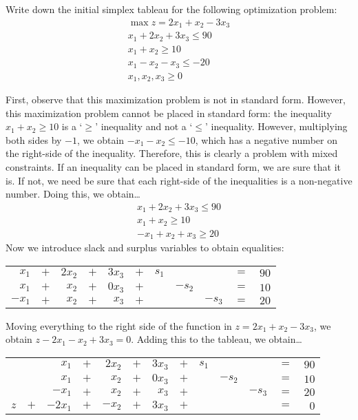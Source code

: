 \documentclass[11pt,letterpaper]{article}
\begin{document}
\newpage



 Write down the initial simplex tableau for the following optimization problem:
	\[
	\begin{aligned}
	\max z= 2x_1 + x_2 - 3x_3 \\
	x_1 + 2x_2 + 3x_3 \leq 90 \\
	x_1 + x_2 \geq 10 \\
	x_1 - x_2 - x_3 \leq -20 \\
	x_1, x_2, x_3 \geq 0 
	\end{aligned}
	\] \pspace

\sol First, observe that this maximization problem is not in standard form. However, this maximization problem cannot be placed in standard form: the inequality $x_1 + x_2 \geq 10$ is a `$\geq$' inequality and not a `$\leq$' inequality. However, multiplying both sides by $-1$, we obtain $-x_1 - x_2 \leq -10$, which has a negative number on the right-side of the inequality. Therefore, this is clearly a problem with mixed constraints. If an inequality can be placed in standard form, we are sure that it is. If not, we need be sure that each right-side of the inequalities is a non-negative number. Doing this, we obtain\dots
	\[
	\begin{aligned}
	x_1 + 2x_2 + 3x_3 \leq 90 \\
	x_1 + x_2 \geq 10 \\
	-x_1 + x_2 + x_3 \geq 20 
	\end{aligned}
	\] 
Now we introduce slack and surplus variables to obtain equalities: \par
	\begin{table}[!ht]
	\centering
	\begin{tabular}{rrrrrrrrrrr}
	$x_1$ & $+$ & $2x_2$ & $+$ & $3x_3$ & $+$ & $s_1$ & & & $=$ & $90$ \\
	$x_1$ & $+$ & $x_2$ & $+$ & $0x_3$ & $+$ & & $-s_2$ & & $=$ & $10$ \\
	$-x_1$ & $+$ & $x_2$ & $+$ & $x_3$ & $+$ & & & $-s_3$ & $=$ & $20$
	\end{tabular}
	\end{table} \par
Moving everything to the right side of the function in $z= 2x_1 + x_2 - 3x_3$, we obtain $z - 2x_1 - x_2 + 3x_3= 0$. Adding this to the tableau, we obtain\dots \par
	\begin{table}[!ht]
	\centering
	\begin{tabular}{rrrrrrrrrrrrr}
	&&$x_1$ & $+$ & $2x_2$ & $+$ & $3x_3$ & $+$ & $s_1$ & & & $=$ & $90$ \\
	&&$x_1$ & $+$ & $x_2$ & $+$ & $0x_3$ & $+$ & & $-s_2$ & & $=$ & $10$ \\
	&&$-x_1$ & $+$ & $x_2$ & $+$ & $x_3$ & $+$ & & & $-s_3$ & $=$ & $20$ \\
	$z$ & $+$ & $-2x_1$ & $+$ & $-x_2$ & $+$ & $3x_3$ & $+$ & & & & $=$ & $0$
	\end{tabular}
	\end{table} \par
\end{document}
